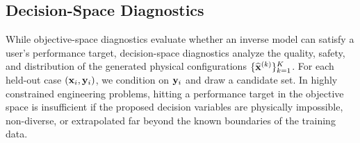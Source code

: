 





\subsection{Decision-Space Diagnostics}\label{subsec:decision_diagnostics}

While objective-space diagnostics evaluate whether an inverse model can satisfy a user's performance target, decision-space diagnostics analyze the quality, safety, and distribution of the generated physical configurations $\{\widehat{\mathbf{x}}^{(k)}\}_{k=1}^{K}$. For each held-out case $(\mathbf{x}_i,\mathbf{y}_i)$, we condition on $\mathbf{y}_i$ and draw a candidate set. In highly constrained engineering problems, hitting a performance target in the objective space is insufficient if the proposed decision variables are physically impossible, non-diverse, or extrapolated far beyond the known boundaries of the training data.

